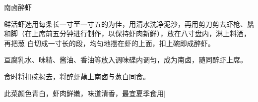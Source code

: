 \begin{recipe}{南卤醉虾}

\ingredients


\preparation

\step 鲜活虾选用每条长一寸至一寸五的为佳，用清水洗净泥沙，再用剪刀剪去虾枪、鬚
和脚（在上席前五分钟进行制作，以保持虾肉新鲜），放在八寸盘内，淋上料酒，再把葱
白切成一寸长的段，均匀地摆在虾的上面，扣上碗即成醉虾。

\step 亘腐乳水、味精、酱油、香油等放入调味碟内调匀，成为南卤，随同醉虾上席。

\step 食时将扣碗揭去，将醉虾蘸上南卤与葱白同食。

\features

此菜颜色青白，虾肉鲜嫩，味道清香，最宜夏季食用|

\end{recipe}

